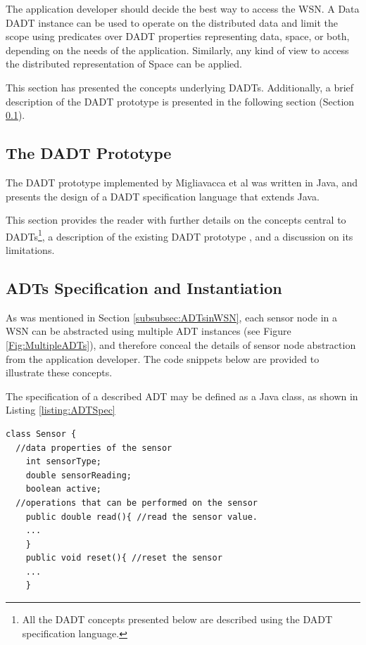 The application developer should decide the best
way to access the WSN. A Data DADT instance can be used to
operate on the distributed data and limit the scope using predicates over
DADT properties representing data, space, or both,
depending on the needs of the application. Similarly, any kind of view to
access the distributed representation of Space can be applied.

This section has presented the concepts underlying DADTs. Additionally, a brief
description of the DADT prototype \cite{migliavacca_DADT:2006} is presented
in the following section (Section \ref{sec:DADTPrototype}).

\subsection {The DADT Prototype} \label{sec:DADTPrototype}

The DADT prototype implemented by Migliavacca et al \cite{migliavacca_DADT:2006}
was written in Java, and presents the design of a DADT specification language
that extends Java.

This section provides the reader with
further details on the concepts central to DADTs\footnote{All the DADT concepts presented below
are described using the DADT specification language.}, a description of the
existing DADT prototype \cite{migliavacca_DADT:2006}, and a discussion on its limitations.

\subsection{ADTs Specification and Instantiation} \label{subsec:ADTSpecInst}

As was mentioned in Section \ref{subsubsec:ADTsinWSN}, each sensor node
in a WSN can be abstracted using multiple ADT instances (see
Figure \ref{Fig:MultipleADTs}), and therefore conceal the details of sensor
node abstraction from the application developer. The code snippets below are
provided to illustrate these concepts.

The specification of a described ADT may be defined as a Java
class, as shown in Listing \ref{listing:ADTSpec}

\begin{lstlisting}[frame=trbl, basewidth={0.55em, 0.6em}, captionpos=b,
basicstyle=\ttfamily\footnotesize, breaklines, caption = Sensor ADT instances, label =
listing:ADTSpec]
class Sensor {
  //data properties of the sensor 
    int sensorType;
    double sensorReading;
    boolean active; 
  //operations that can be performed on the sensor  
    public double read(){ //read the sensor value.
    ...
    } 
    public void reset(){ //reset the sensor
    ...
    }    
\end{lstlisting}
 
